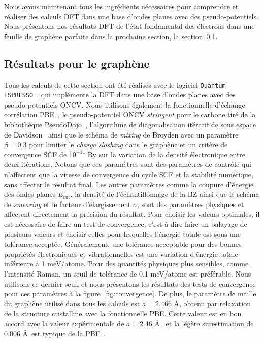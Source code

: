 Nous avons maintenant tous les ingrédients nécessaires pour comprendre et réaliser des calculs DFT dans une base d'ondes planes avec des pseudo-potentiels. Nous présentons nos résultats DFT de l'état fondamental des électrons dans une feuille de graphène parfaite dans la prochaine section, la section~\ref{sec:electron_results}.

\subsection{Résultats pour le graphène}\label{sec:electron_results}

Tous les calculs de cette section ont été réalisés avec le logiciel \texttt{Quantum ESPRESSO}~\cite{giannozziQUANTUMESPRESSOModular2009,giannozziAdvancedCapabilitiesMaterials2017,giannozziQuantumESPRESSOExascale2020}, qui implémente la DFT dans une base d'ondes planes avec des pseudo-potentiels ONCV. Nous utilisons également la fonctionnelle d'échange-corrélation PBE~\cite{perdewGeneralizedGradientApproximation1996a}, le pseudo-potentiel ONCV \textit{stringent} pour le carbone tiré de la bibliothèque PseudoDojo~\cite{vansettenPseudoDojoTrainingGrading2018}, l'algorithme de diagonalisation itératif de sous espace de Davidson~\cite{davidsonIterativeCalculationFew1975} ainsi que le schéma de \textit{mixing} de Broyden avec un paramètre $\beta=0.3$ pour limiter le \textit{charge sloshing} dans le graphène et un critère de convergence SCF de $10^{-14}$ Ry sur la variation de la densité électronique entre deux itérations. Notons que ces paramètres sont des paramètres de contrôle qui n'affectent que la vitesse de convergence du cycle SCF et la stabilité numérique, sans affecter le résultat final. Les autres paramètres comme la coupure d'énergie des ondes planes $E_\text{cut}$, la densité de l'échantillonnage de la BZ ainsi que le schéma de \textit{smearing} et le facteur d'élargissement $\sigma$, sont des paramètres physiques et affectent directement la précision du résultat. Pour choisir les valeurs optimales, il est nécessaire de faire un test de convergence, c'est-à-dire faire un balayage de plusieurs valeurs et choisir celles pour lesquelles l'énergie totale est sous une tolérance acceptée. Généralement, une tolérance acceptable pour des bonnes propriétés électroniques et vibrationnelles est une variation d'énergie totale  inférieure à 1 meV/atome. Pour des quantités physiques plus sensibles, comme l'intensité Raman, un seuil de tolérance de 0.1 meV/atome est préférable. Nous utilisons ce dernier seuil et nous présentons les résultats des tests de convergence pour ces paramètres à la figure~\ref{fig:convergence}. De plus, le paramètre de maille du graphène utilisé dans tous les calculs est $a=2.466$ \AA, obtenu par relaxation de la structure cristalline avec la fonctionnelle PBE. Cette valeur est en bon accord avec la valeur expérimentale de $a=2.46$ \AA~\cite{bosakElasticitySinglecrystallineGraphite2007a} et la légère surestimation de $0.006$ \AA~est typique de la PBE~\cite{mounetFirstprinciplesDeterminationStructural2005b}.

